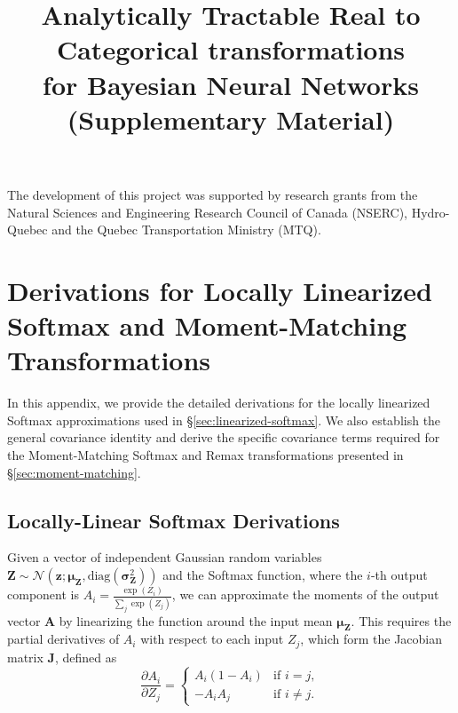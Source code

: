 \documentclass{uai2026} %
\begin{document}
\begin{acknowledgements} %
The development of this project was supported by research grants from the Natural Sciences and Engineering Research Council of Canada (NSERC), Hydro-Quebec and the Quebec Transportation Ministry (MTQ).
\end{acknowledgements}



\newpage

\onecolumn

\title{Analytically Tractable Real to Categorical transformations \\ for Bayesian Neural Networks (Supplementary Material)}
\maketitle

\appendix
\section{Derivations for Locally Linearized Softmax and Moment-Matching Transformations}\label{app:derivations}

In this appendix, we provide the detailed derivations for the locally linearized Softmax approximations used in \S\ref{sec:linearized-softmax}. We also establish the general covariance identity and derive the specific covariance terms required for the Moment-Matching Softmax and Remax transformations presented in \S\ref{sec:moment-matching}.

\subsection{Locally-Linear Softmax Derivations}\label{app:local_linearization-softmax-simple}

Given a vector of independent Gaussian random variables $\bm{Z} \sim\mathcal{N}(\bm{z};\bm{\mu}_{\bm{Z}},\text{diag}(\bm{\sigma}_{\bm{Z}}^2))$ and the Softmax function, where the $i$-th output component is $A_i = \frac{\exp(Z_i)}{\sum_j \exp(Z_j)}$, we can approximate the moments of the output vector $\bm{A}$ by linearizing the function around the input mean $\bm{\mu}_{\bm{Z}}$. This requires the partial derivatives of $A_i$ with respect to each input $Z_j$, which form the Jacobian matrix $\mathbf{J}$, defined as
\begin{equation*}
\frac{\partial A_i}{\partial Z_j} =
\begin{cases}
A_i(1 - A_i) & \text{if } i = j, \\
-A_i A_j & \text{if } i \neq j.
\end{cases}
\end{equation*}
\end{document}

